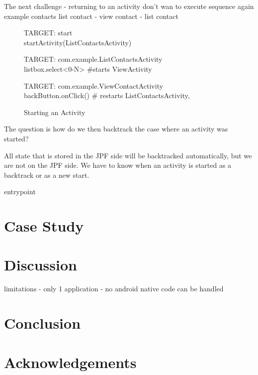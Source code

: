 \documentclass{acm_proc_article-sp}
\begin{document}
The next challenge 
-  returning to an activity don't wan to execute sequence again example contacts list contact - view contact - list contact

\begin{figure}
{\small
{\sf 
TARGET: start\\
  startActivity(ListContactsActivity)

TARGET: com.example.ListContactsActivity\\
  listbox.select<0-N> \#starts ViewActivity

TARGET: com.example.ViewContactActivity\\
   backButton.onClick() \# restarts ListContactsActivity, 
}
}
\caption{Starting an Activity}
\end{figure}








The question is how do we then backtrack the case where an activity was started?

All state that is stored in the JPF side will be backtracked automatically, but we are not on the JPF side. We have to know when an
activity is started as a backtrack or as a new start. 






entrypoint 
\newpage
\section{Case Study}





\section{Discussion}


limitations
- only 1 application
- no android native code can be handled

\section{Conclusion}






\section{Acknowledgements}

%

% 
\end{document}
